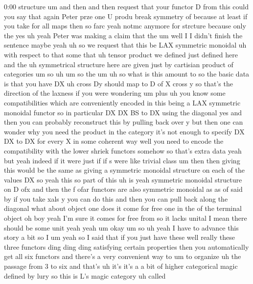 \begin{unfinished}{0:00}
structure
um  and  then  and  then
request  that  your  functor  D  from
this  could  you  say  that  again
Peter  prze  one  U
produ  break
symmetry
of  because  at  least  if  you  take  for  all
maps  then  so
farc
yeah  notmc  anymore  for  strcture  because
only
the
yes
uh
yeah  Peter  was  making  a  claim  that  the
um  well  I  I  didn't  finish  the  sentence
maybe  yeah
uh  so  we  request  that  this  be  LAX
symmetric
monoidal  uh  with  respect  to  that  some
that  uh  tensor  product  we  defined  just
defined  here  and  the  uh  symmetrical
structure  here  are  given  just  by
cartisian  product  of
categories  um
so
uh
um  so  the
um  uh  so  what  is  this  amount  to  so  the
basic  data  is  that  you  have
DX  uh  cross
Dy  should  map  to  D  of  X  cross  y  so
that's  the  direction  of  the  laxness  if
you  were  wondering  um  plus  uh  you
know  some  compatibilities  which  are
conveniently  encoded  in  this  being  a  LAX
symmetric  monoidal
functor  so  in  particular  DX  DX  BS  to  DX
using  the  diagonal  yes  and  then  you  can
probably  reconstruct  this  by  pulling
back
over  y  but  then  one  can  wonder  why  you
need  the  product  in  the  category  it's
not  enough  to  specify  DX  DX  to  DX  for
every  X  in  some  coherent  way  well  you
need  to  encode  the  compatibility  with
the  lower  shriek  functors  somehow
so  that's  extra
data  yeah  but  yeah  indeed  if  it  were
just  if  if  s  were  like  trivial  class  um
then  then  giving  this  would  be  the  same
as  giving  a  symmetric  monoidal  structure
on  each  of  the  values  DX  so  yeah  this  so
part  of  this  uh  is  yeah  symmetric
monoidal  structure  on  D
ofx  and  then  the  f  ofar  functors  are
also  symmetric
monoidal  as  as  of  said  by  if  you  take
xals  y  you  can  do  this  and  then  you  can
pull  back  along  the
diagonal  what  about  object  one  does  it
come  for  free  one  in  the  of  the  terminal
object  oh  boy  yeah  I'm  sure  it  comes  for
free  from  so  it  lacks  unital  I  mean
there  should  be  some  unit
yeah
yeah
um  okay
um
so  uh  yeah  I  have  to  advance  this  story
a  bit  so  I
um  yeah  so  I  said  that  if  you  just  have
these  well  really  these  three  functors
ding  ding  ding  satisfying  certain
properties  then  you  automatically  get
all  six  functors  and  there's  a  very
convenient  way
to
um  to
organize  uh  the  passage  from  3  to  six
and  that's  uh  it's  it's  a  a  bit  of
higher  categorical  magic  defined  by  lury
so  this  is  L's  magic
category  uh  called

\end{unfinished}

